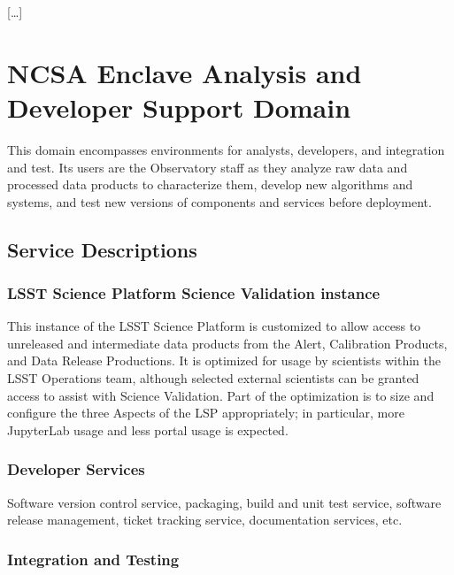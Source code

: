 \documentclass[DM,lsstdraft,toc]{lsstdoc}
\begin{document}
{[}\ldots{}{]}

\section{NCSA Enclave Analysis and Developer Support
Domain}\label{ncsa-enclave-analysis-and-developer-support-domain}

This domain encompasses environments for analysts, developers, and
integration and test. Its users are the Observatory staff as they
analyze raw data and processed data products to characterize them,
develop new algorithms and systems, and test new versions of components
and services before deployment.

\subsection{Service Descriptions}\label{service-descriptions-4}

\subsubsection{LSST Science Platform Science Validation
instance}\label{lsst-science-platform-science-validation-instance}

This instance of the LSST Science Platform is customized to allow access
to unreleased and intermediate data products from the Alert, Calibration
Products, and Data Release Productions. It is optimized for usage by
scientists within the LSST Operations team, although selected external
scientists can be granted access to assist with Science Validation. Part
of the optimization is to size and configure the three Aspects of the
LSP appropriately; in particular, more JupyterLab usage and less portal
usage is expected.

\subsubsection{Developer Services}\label{developer-services}

Software version control service, packaging, build and unit test
service, software release management, ticket tracking service,
documentation services, etc.

\subsubsection{Integration and Testing}\label{integration-and-testing}
\end{document}
